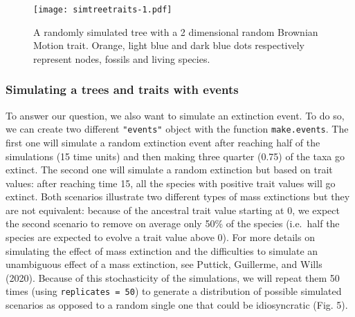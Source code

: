 \documentclass[
]{article}
\begin{document}
\begin{figure}
\centering
\texttt{[image: simtreetraits-1.pdf]}
\caption{A randomly simulated tree with a 2 dimensional random Brownian
Motion trait. Orange, light blue and dark blue dots respectively
represent nodes, fossils and living species.}
\end{figure}

\hypertarget{simulating-a-trees-and-traits-with-events}{%
\subsubsection{Simulating a trees and traits with
events}\label{simulating-a-trees-and-traits-with-events}}

To answer our question, we also want to simulate an extinction event. To
do so, we can create two different \texttt{"events"} object with the
function \texttt{make.events}. The first one will simulate a random
extinction event after reaching half of the simulations (15 time units)
and then making three quarter (0.75) of the taxa go extinct. The second
one will simulate a random extinction but based on trait values: after
reaching time 15, all the species with positive trait values will go
extinct. Both scenarios illustrate two different types of mass
extinctions but they are not equivalent: because of the ancestral trait
value starting at 0, we expect the second scenario to remove on average
only 50\% of the species (i.e.~half the species are expected to evolve a
trait value above 0). For more details on simulating the effect of mass
extinction and the difficulties to simulate an unambiguous effect of a
mass extinction, see Puttick, Guillerme, and Wills (2020). Because of
this stochasticity of the simulations, we will repeat them 50 times
(using \texttt{replicates\ =\ 50}) to generate a distribution of
possible simulated scenarios as opposed to a random single one that
could be idiosyncratic (Fig. 5).
\end{document}
